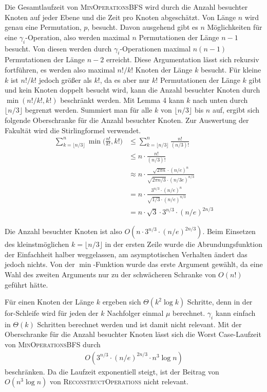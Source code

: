 \documentclass[a4paper, 10pt, ngerman]{article}
\begin{document}
Die Gesamtlaufzeit von \textsc{MinOperationsBFS} wird durch die Anzahl besuchter Knoten auf jeder Ebene und die Zeit pro Knoten abgeschätzt. Von Länge $n$ wird genau eine Permutation, $p$, besucht. Davon ausgehend gibt es $n$ Möglichkeiten für eine $\gamma_i$-Operation, also werden maximal $n$ Permutationen der Länge $n - 1$ besucht. Von diesen werden durch $\gamma_i$-Operationen maximal $n(n-1)$ Permutationen der Länge $n - 2$ erreicht. Diese Argumentation lässt sich rekursiv fortführen, es werden also maximal $n! / k!$ Knoten der Länge $k$ besucht. Für kleine $k$ ist $n! / k!$ jedoch größer als $k!$, da es aber nur $k!$ Permutationen der Länge $k$ gibt und kein Knoten doppelt besucht wird, kann die Anzahl besuchter Knoten durch $\min(n! / k!, k!)$ beschränkt werden. Mit Lemma 4 kann $k$ nach unten durch $\lfloor n/3 \rfloor$ begrenzt werden. Summiert man für alle $k$ von $\lfloor n/3 \rfloor$ bis $n$ auf, ergibt sich folgende Oberschranke für die Anzahl besuchter Knoten. Zur Auswertung der Fakultät wird die Stirlingformel verwendet.
\begin{align*}
    \sum_{k = \lfloor n/3 \rfloor}^n \min \bigg ( \frac {n!}{k!}, k! \bigg )
     & \le \sum_{k = \lfloor n/3 \rfloor}^n  \frac {n!} {(n/3)!}
    \\ & \le n \cdot \frac {n!} {(n/3)!}
    \\ & \approx n \cdot
    \frac {\sqrt{2 \pi n} \cdot (n/e)^n} {\sqrt{2 \pi n/3} \cdot (n/3e)^{n/3}}
    \\ & = n \cdot
    \frac {3^{n/3} \cdot (n/e)^n } {\sqrt{1/3} \cdot (n/e)^{n/3}}
    \\ & = n \cdot \sqrt 3 \cdot 3^{n/3} \cdot (n/e)^{2n/3}
\end{align*}

Die Anzahl besuchter Knoten ist also $O(n \cdot 3^{n/3} \cdot (n/e)^{2n/3})$. Beim Einsetzen des kleinstmöglichen $k = \lfloor n/3 \rfloor$ in der ersten Zeile wurde die Abrundungsfunktion der Einfachheit halber weggelassen, am asymptotischen Verhalten ändert das jedoch nichts. Von der $\min$-Funktion wurde das erste Argument gewählt, da eine Wahl des zweiten Arguments nur zu der schwächeren Schranke von $O(n!)$ geführt hätte.

Für einen Knoten der Länge $k$ ergeben sich $\Theta(k^2 \log k)$ Schritte, denn in der for-Schleife wird für jeden der $k$ Nachfolger einmal $\mu$ berechnet. $\gamma_i$ kann einfach in $\Theta(k)$ Schritten berechnet werden und ist damit nicht relevant. Mit der Oberschranke für die Anzahl besuchter Knoten lässt sich die Worst Case-Laufzeit von \textsc{MinOperationsBFS} durch
\begin{align*}
    O(3^{n/3} \cdot (n/e)^{2n/3} \cdot n^3 \log n)
\end{align*}
beschränken. Da die Laufzeit exponentiell steigt, ist der Beitrag von $O(n^3 \log n)$ von \textsc{ReconstructOperations} nicht relevant.
\end{document}
